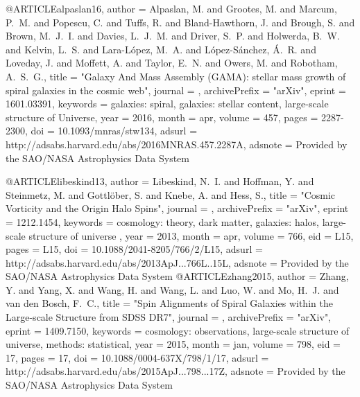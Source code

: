 \documentclass{aa}
\begin{document}
@ARTICLE{alpaslan16,
   author = {{Alpaslan}, M. and {Grootes}, M. and {Marcum}, P.~M. and {Popescu}, C. and 
	{Tuffs}, R. and {Bland-Hawthorn}, J. and {Brough}, S. and {Brown}, M.~J.~I. and 
	{Davies}, L.~J.~M. and {Driver}, S.~P. and {Holwerda}, B.~W. and 
	{Kelvin}, L.~S. and {Lara-L{\'o}pez}, M.~A. and {L{\'o}pez-S{\'a}nchez}, {\'A}.~R. and 
	{Loveday}, J. and {Moffett}, A. and {Taylor}, E.~N. and {Owers}, M. and 
	{Robotham}, A.~S.~G.},
    title = "{Galaxy And Mass Assembly (GAMA): stellar mass growth of spiral galaxies in the cosmic web}",
  journal = {\mnras},
archivePrefix = "arXiv",
   eprint = {1601.03391},
 keywords = {galaxies: spiral, galaxies: stellar content, large-scale structure of Universe},
     year = 2016,
    month = apr,
   volume = 457,
    pages = {2287-2300},
      doi = {10.1093/mnras/stw134},
   adsurl = {http://adsabs.harvard.edu/abs/2016MNRAS.457.2287A},
  adsnote = {Provided by the SAO/NASA Astrophysics Data System}
}


@ARTICLE{libeskind13,
   author = {{Libeskind}, N.~I. and {Hoffman}, Y. and {Steinmetz}, M. and 
	{Gottl{\"o}ber}, S. and {Knebe}, A. and {Hess}, S.},
    title = "{Cosmic Vorticity and the Origin Halo Spins}",
  journal = {\apjl},
archivePrefix = "arXiv",
   eprint = {1212.1454},
 keywords = {cosmology: theory, dark matter, galaxies: halos, large-scale structure of universe },
     year = 2013,
    month = apr,
   volume = 766,
      eid = {L15},
    pages = {L15},
      doi = {10.1088/2041-8205/766/2/L15},
   adsurl = {http://adsabs.harvard.edu/abs/2013ApJ...766L..15L},
  adsnote = {Provided by the SAO/NASA Astrophysics Data System}
}
@ARTICLE{zhang2015,
   author = {{Zhang}, Y. and {Yang}, X. and {Wang}, H. and {Wang}, L. and 
	{Luo}, W. and {Mo}, H.~J. and {van den Bosch}, F.~C.},
    title = "{Spin Alignments of Spiral Galaxies within the Large-scale Structure from SDSS DR7}",
  journal = {\apj},
archivePrefix = "arXiv",
   eprint = {1409.7150},
 keywords = {cosmology: observations, large-scale structure of universe, methods: statistical},
     year = 2015,
    month = jan,
   volume = 798,
      eid = {17},
    pages = {17},
      doi = {10.1088/0004-637X/798/1/17},
   adsurl = {http://adsabs.harvard.edu/abs/2015ApJ...798...17Z},
  adsnote = {Provided by the SAO/NASA Astrophysics Data System}
}
\end{document}

